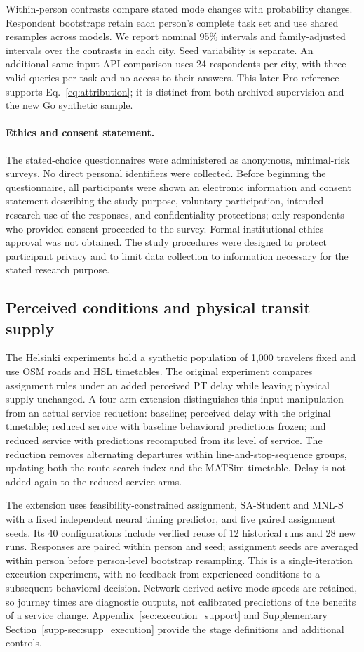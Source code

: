 Within-person contrasts compare stated mode changes with probability changes. Respondent bootstraps retain each person's complete task set and use shared resamples across models. We report nominal 95\% intervals and family-adjusted intervals over the contrasts in each city. Seed variability is separate. An additional same-input API comparison uses 24 respondents per city, with three valid queries per task and no access to their answers. This later Pro reference supports Eq.~\ref{eq:attribution}; it is distinct from both archived supervision and the new Go synthetic sample.

\paragraph{Ethics and consent statement.} The stated-choice questionnaires were administered as anonymous, minimal-risk surveys. No direct personal identifiers were collected. Before beginning the questionnaire, all participants were shown an electronic information and consent statement describing the study purpose, voluntary participation, intended research use of the responses, and confidentiality protections; only respondents who provided consent proceeded to the survey. Formal institutional ethics approval was not obtained. The study procedures were designed to protect participant privacy and to limit data collection to information necessary for the stated research purpose.

\subsection{Perceived conditions and physical transit supply}
\label{sec:execution_design}
The Helsinki experiments hold a synthetic population of 1,000 travelers fixed and use OSM roads and HSL timetables. The original experiment compares assignment rules under an added perceived PT delay while leaving physical supply unchanged. A four-arm extension distinguishes this input manipulation from an actual service reduction: baseline; perceived delay with the original timetable; reduced service with baseline behavioral predictions frozen; and reduced service with predictions recomputed from its level of service. The reduction removes alternating departures within line-and-stop-sequence groups, updating both the route-search index and the MATSim timetable. Delay is not added again to the reduced-service arms.

The extension uses feasibility-constrained assignment, SA-Student and MNL-S with a fixed independent neural timing predictor, and five paired assignment seeds. Its 40 configurations include verified reuse of 12 historical runs and 28 new runs. Responses are paired within person and seed; assignment seeds are averaged within person before person-level bootstrap resampling. This is a single-iteration execution experiment, with no feedback from experienced conditions to a subsequent behavioral decision. Network-derived active-mode speeds are retained, so journey times are diagnostic outputs, not calibrated predictions of the benefits of a service change. Appendix~\ref{sec:execution_support} and Supplementary Section~\ref{supp-sec:supp_execution} provide the stage definitions and additional controls.
